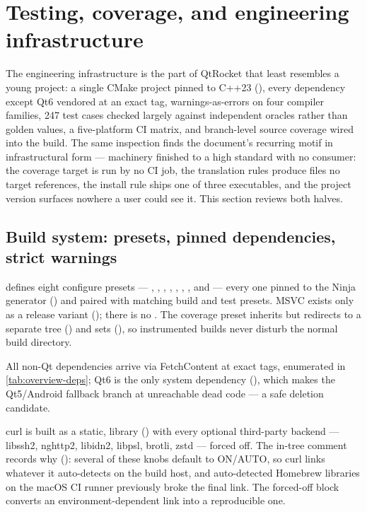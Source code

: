\section{Testing, coverage, and engineering infrastructure}\label{sec:testing}

The engineering infrastructure is the part of QtRocket that least resembles a young project:
a single CMake project pinned to C++23 (), every dependency except
Qt6 vendored at an exact tag, warnings-as-errors on four compiler families, 247 test cases
checked largely against independent oracles rather than golden values, a five-platform CI
matrix, and branch-level source coverage wired into the build. The same inspection finds the
document's recurring motif in infrastructural form --- machinery finished to a high standard
with no consumer: the coverage target is run by no CI job, the translation rules produce
files no target references, the install rule ships one of three executables, and the project
version surfaces nowhere a user could see it. This section reviews both halves.

\subsection{Build system: presets, pinned dependencies, strict warnings}\label{sec:testing-build}

 defines eight configure presets --- , ,
, , , ,
, and  --- every one pinned to the Ninja generator
() and paired with matching build and test presets. MSVC exists
only as a release variant (); there is no . The
coverage preset inherits  but redirects to a separate
 tree () and sets
 (), so instrumented builds
never disturb the normal build directory.

All non-Qt dependencies arrive via FetchContent at exact tags, enumerated in
\cref{tab:overview-deps}; Qt6 is the only system dependency (),
which makes the Qt5/Android fallback branch at  unreachable dead
code --- a safe deletion candidate.

\begin{designrule}
curl is built as a static,  library () with every
optional third-party backend --- libssh2, nghttp2, libidn2, libpsl, brotli, zstd --- forced
off. The in-tree comment records why (): several of these knobs
default to ON/AUTO, so curl links whatever it auto-detects on the build host, and
auto-detected Homebrew libraries on the macOS CI runner previously broke the final link.
The forced-off block converts an environment-dependent link into a reproducible one.
\end{designrule}

